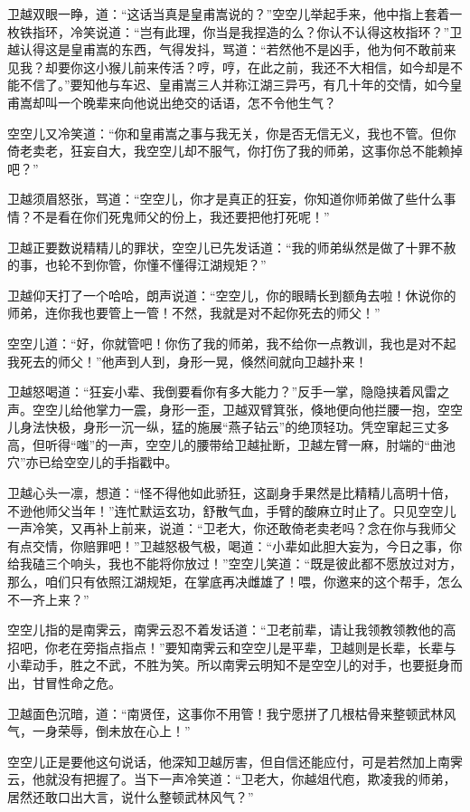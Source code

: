 \documentclass[12pt,oneside]{book}
\begin{document}
卫越双眼一睁，道：``这话当真是皇甫嵩说的？''空空儿举起手来，他中指上套着一枚铁指环，冷笑说道：``岂有此理，你当是我捏造的么？你认不认得这枚指环？''卫越认得这是皇甫嵩的东西，气得发抖，骂道：``若然他不是凶手，他为何不敢前来见我？却要你这小猴儿前来传活？哼，哼，在此之前，我还不大相信，如今却是不能不信了。''要知他与车迟、皇甫嵩三人并称江湖三异丐，有几十年的交情，如今皇甫嵩却叫一个晚辈来向他说出绝交的话语，怎不令他生气？

空空儿又冷笑道：``你和皇甫嵩之事与我无关，你是否无信无义，我也不管。但你倚老卖老，狂妄自大，我空空儿却不服气，你打伤了我的师弟，这事你总不能赖掉吧？''

卫越须眉怒张，骂道：``空空儿，你才是真正的狂妄，你知道你师弟做了些什么事情？不是看在你们死鬼师父的份上，我还要把他打死呢！''

卫越正要数说精精儿的罪状，空空儿已先发话道：``我的师弟纵然是做了十罪不赦的事，也轮不到你管，你懂不懂得江湖规矩？''

卫越仰天打了一个哈哈，朗声说道：``空空儿，你的眼睛长到额角去啦！休说你的师弟，连你我也要管上一管！不然，我就是对不起你死去的师父！''

空空儿道：``好，你就管吧！你伤了我的师弟，我不给你一点教训，我也是对不起我死去的师父！''他声到人到，身形一晃，倏然间就向卫越扑来！

卫越怒喝道：``狂妄小辈、我倒要看你有多大能力？''反手一掌，隐隐挟着风雷之声。空空儿给他掌力一震，身形一歪，卫越双臂箕张，倏地便向他拦腰一抱，空空儿身法快极，身形一沉一纵，猛的施展``燕子钻云''的绝顶轻功。凭空窜起三丈多高，但听得``嗤''的一声，空空儿的腰带给卫越扯断，卫越左臂一麻，肘端的``曲池穴''亦已给空空儿的手指戳中。

卫越心头一凛，想道：``怪不得他如此骄狂，这副身手果然是比精精儿高明十倍，不逊他师父当年！''连忙默运玄功，舒散气血，手臂的酸麻立时止了。只见空空儿一声冷笑，又再补上前来，说道：``卫老大，你还敢倚老卖老吗？念在你与我师父有点交情，你赔罪吧！''卫越怒极气极，喝道：``小辈如此胆大妄为，今日之事，你给我磕三个响头，我也不能将你放过！''空空儿笑道：``既是彼此都不愿放过对方，那么，咱们只有依照江湖规矩，在掌底再决雌雄了！喂，你邀来的这个帮手，怎么不一齐上来？''

空空儿指的是南霁云，南霁云忍不着发话道：``卫老前辈，请让我领教领教他的高招吧，你老在旁指点指点！''要知南霁云和空空儿是平辈，卫越则是长辈，长辈与小辈动手，胜之不武，不胜为笑。所以南霁云明知不是空空儿的对手，也要挺身而出，甘冒性命之危。

卫越面色沉暗，道：``南贤侄，这事你不用管！我宁愿拼了几根枯骨来整顿武林风气，一身荣辱，倒未放在心上！''

空空儿正是要他这句说话，他深知卫越厉害，但自信还能应付，可是若然加上南霁云，他就没有把握了。当下一声冷笑道：``卫老大，你越俎代庖，欺凌我的师弟，居然还敢口出大言，说什么整顿武林风气？''
\end{document}
